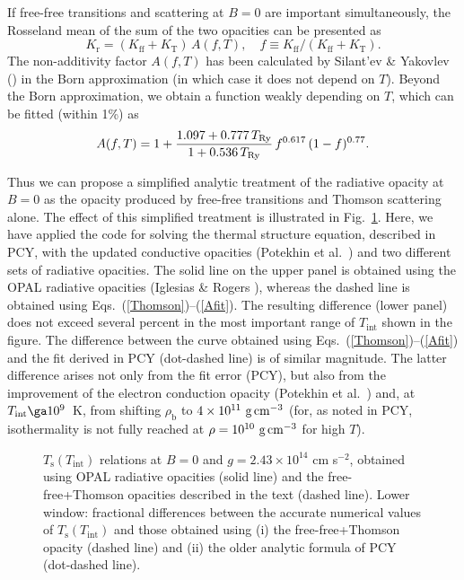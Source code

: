 \documentclass{aa}
\begin{document}
If free-free transitions and scattering at $B=0$ are 
important simultaneously,
the Rosseland mean of the sum of the two opacities
can be presented as
%
\begin{equation}
   K_\mathrm{r}=(K_\mathrm{ff}+K_\mathrm{T})\,A(f,T),
\quad
   f\equiv K_\mathrm{ff}/(K_\mathrm{ff}+K_\mathrm{T}).
\label{KR}
\end{equation}
%
The non-additivity factor $A(f,T)$ has
been calculated by Silant'ev \& Yakovlev (\cite{SilYak})
in the Born approximation
(in which case it does not depend on $T$).
Beyond the Born approximation, we obtain a function weakly
depending on $T$,
which can be fitted (within 1\%) as
%
\begin{equation}
   A(f,T) = 1+{1.097+0.777\,T_\mathrm{Ry} \over 1+0.536\,T_\mathrm{Ry}}
           \,f^{0.617}\,(1-f)^{0.77}.
\label{Afit}
\end{equation}
%

Thus we can propose a simplified analytic treatment
of the radiative opacity at $B=0$ as the opacity
produced by free-free transitions and Thomson scattering alone.
The effect of this simplified treatment
is illustrated in Fig.~\ref{fig-tbts_chk}.
Here, we have applied the code for solving 
the thermal structure equation, described in PCY, with 
the updated conductive opacities (Potekhin et al.\ \cite{pbhy99})
and two different sets of radiative opacities.
The solid line on the upper panel
is obtained using the OPAL radiative opacities
(Iglesias \& Rogers \cite{OPAL}), whereas the dashed line
is obtained using Eqs.\ (\ref{Thomson})--(\ref{Afit}).
The resulting difference (lower panel) 
does not exceed several percent
in the most important range of $T_\mathrm{int}$ shown in the figure.
The difference between the curve obtained
using Eqs.\ (\ref{Thomson})--(\ref{Afit})
and the fit
derived in PCY (dot-dashed line) is of similar magnitude.
The latter difference arises not only from the fit error (PCY),
but also from
the improvement of the electron conduction opacity 
(Potekhin et al.\ \cite{pbhy99}) and, at $T_\mathrm{int}\ga10^9$~K,
from shifting $\rho_\mathrm{b}$
to $4\times10^{11}\mbox{~g\,cm$^{-3}$}$ (for, as noted 
in PCY, isothermality
is not fully reached at $\rho=10^{10}\mbox{~g\,cm$^{-3}$}$ for high $T$).

\begin{figure}
\centering
\epsfxsize=86mm
\caption{$T_\mathrm{s}(T_\mathrm{int})$
relations at $B=0$ and $g=2.43 \times 10^{14}$ cm s$^{-2}$, 
obtained using OPAL radiative opacities
(solid line) and the free-free+Thomson
opacities described in the text (dashed line).
Lower window:
fractional differences between the accurate numerical 
values of $T_\mathrm{s}(T_\mathrm{int})$
and those
obtained using (i) the free-free+Thomson opacity
(dashed line) and (ii)
the older analytic formula of PCY (dot-dashed line).
}
\label{fig-tbts_chk}
\end{figure}
\end{document}
